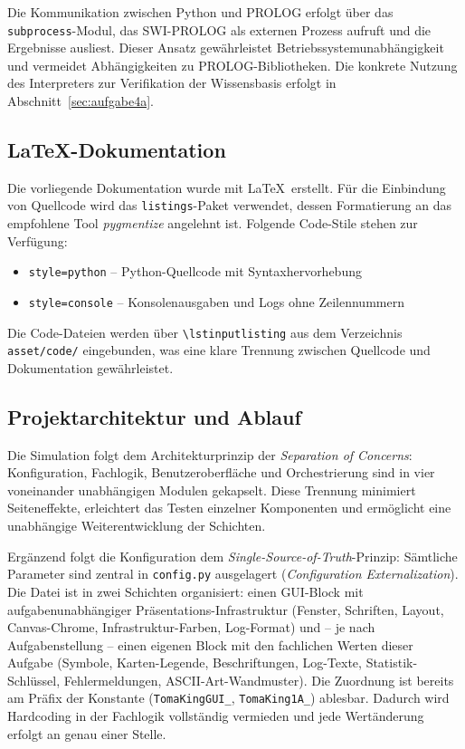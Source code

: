 Die Kommunikation zwischen Python und \acs{PROLOG} erfolgt über das \texttt{subprocess}-Modul, das \acs{SWI}-\acs{PROLOG} als externen Prozess aufruft und die Ergebnisse ausliest. Dieser Ansatz gewährleistet Betriebssystemunabhängigkeit und vermeidet Abhängigkeiten zu \acs{PROLOG}-Bibliotheken. Die konkrete Nutzung des Interpreters zur Verifikation der Wissensbasis erfolgt in Abschnitt~\ref{sec:aufgabe4a}.

\subsection{LaTeX-Dokumentation}

Die vorliegende Dokumentation wurde mit \LaTeX\ erstellt. Für die Einbindung von Quellcode wird das \texttt{listings}-Paket verwendet, dessen Formatierung an das empfohlene Tool \textit{pygmentize} angelehnt ist. Folgende Code-Stile stehen zur Verfügung:

\begin{itemize}
    \item \texttt{style=python} – Python-Quellcode mit Syntaxhervorhebung
    \item \texttt{style=console} – Konsolenausgaben und Logs ohne Zeilennummern
\end{itemize}

Die Code-Dateien werden über \texttt{\textbackslash lstinputlisting} aus dem Verzeichnis \texttt{asset/code/} eingebunden, was eine klare Trennung zwischen Quellcode und Dokumentation gewährleistet.

\subsection{Projektarchitektur und Ablauf}

Die Simulation folgt dem Architekturprinzip der \textit{Separation of Concerns}: Konfiguration, Fachlogik, Benutzeroberfläche und Orchestrierung sind in vier voneinander unabhängigen Modulen gekapselt. Diese Trennung minimiert Seiteneffekte, erleichtert das Testen einzelner Komponenten und ermöglicht eine unabhängige Weiterentwicklung der Schichten.

Ergänzend folgt die Konfiguration dem \textit{Single-Source-of-Truth}-Prinzip: Sämtliche Parameter sind zentral in \texttt{config.py} ausgelagert (\textit{Configuration Externalization}). Die Datei ist in zwei Schichten organisiert: einen \acs{GUI}-Block mit aufgabenunabhängiger Präsentations-Infrastruktur (Fenster, Schriften, Layout, Canvas-Chrome, Infrastruktur-Farben, Log-Format) und – je nach Aufgabenstellung – einen eigenen Block mit den fachlichen Werten dieser Aufgabe (Symbole, Karten-Legende, Beschriftungen, Log-Texte, Statistik-Schlüssel, Fehlermeldungen, \acs{ASCII}-Art-Wandmuster). Die Zuordnung ist bereits am Präfix der Konstante (\texttt{TomaKingGUI\_}, \texttt{TomaKing1A\_}) ablesbar. Dadurch wird Hardcoding in der Fachlogik vollständig vermieden und jede Wertänderung erfolgt an genau einer Stelle.


